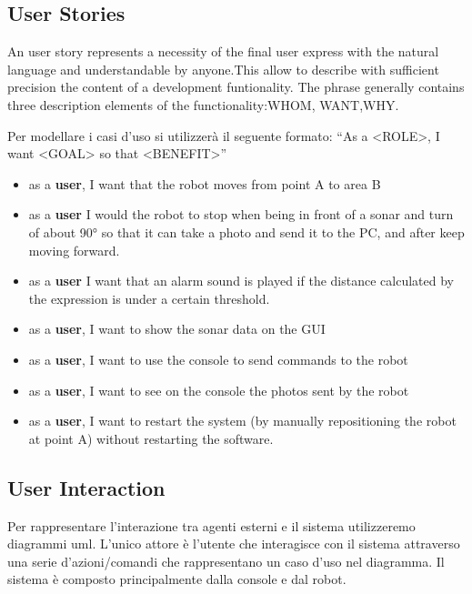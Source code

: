 \documentclass[a4paper]{article}
\begin{document}


\subsection {User Stories}
An user story represents a necessity of the final user express with the natural language and understandable by anyone.This allow to describe with sufficient precision the content of a development funtionality. The phrase generally contains three description elements of the functionality:WHOM, WANT,WHY.

Per modellare i casi d’uso si utilizzerà il seguente formato:
“As a <ROLE>, I want <GOAL> so that <BENEFIT>”
\begin{itemize}
	\item as a \textbf{user}, I want that the robot moves from point A to area B
	\item as a \textbf{user} I would the robot to stop when being in front of a sonar and turn of about 90° so that it can take a photo and send it to the PC, and after keep moving forward.
	\item as a \textbf{user} I want that an alarm sound is played if the distance calculated by the expression is under a certain threshold.
	\item as a \textbf{user}, I want to show the sonar data on the GUI
	\item as a \textbf{user}, I want to use the console to send commands to the robot
	\item as a \textbf{user}, I want to see on the console the photos sent by the robot
	\item as a \textbf{user}, I want to restart the system (by manually repositioning the robot at point A) without restarting the software.
\end{itemize}

\subsection {User Interaction}
Per rappresentare l’interazione tra agenti esterni e il sistema utilizzeremo diagrammi uml.
L’unico attore è l’utente che interagisce con il sistema attraverso una serie d’azioni/comandi che rappresentano un caso d’uso nel diagramma. Il sistema è composto principalmente dalla console e dal robot. 
\end{document}
